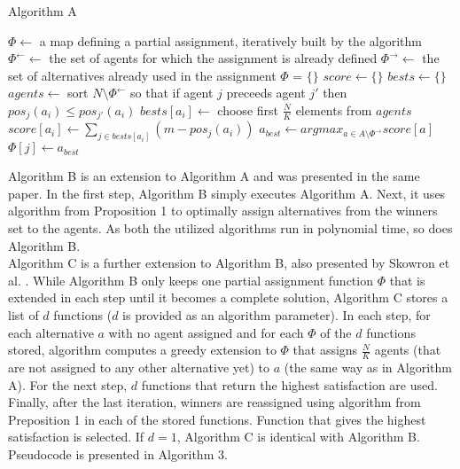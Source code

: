\begin{algorithm}
\caption{Algorithm A}\label{euclid}
\begin{algorithmic}[1]
		\State $\Phi \gets$ a map defining a partial assignment, iteratively built by the algorithm
		\State $\Phi^{\leftarrow} \gets$ the set of agents for which the assignment is already defined
		\State $\Phi^{\rightarrow} \gets$ the set of alternatives already used in the assignment%
		\State $\Phi$ = $\{\}$
			\State $score \gets \{\}$
			\State $bests \gets \{\}$
				\State $agents \gets$ sort $N \setminus \Phi^{\leftarrow}$ so that if agent $j$ preceeds agent $j'$ then $pos_{j}(a_{i}) \leq pos_{j'}(a_{i})$
				\State $bests[a_{i}] \gets$ choose first $\frac{N}{K}$ elements from $agents$
				\State $score[a_{i}] \gets \sum_{j \in bests[a_{i}]}(m - pos_{j}(a_{i}))$
			\EndFor
			\State $a_{best} \gets argmax_{a \in A \setminus \Phi^{\rightarrow}} score[a]$
				\State $\Phi[j] \gets a_{best}$
			\EndFor
		\EndFor
	\EndProcedure
\end{algorithmic}
\end{algorithm}

Algorithm B is an extension to Algorithm A and was presented in the same paper. \cite{1} In the first step, Algorithm B simply executes Algorithm A. Next, it uses algorithm from Proposition 1 to optimally assign alternatives from the winners set to the agents. As both the utilized algorithms run in polynomial time, so does Algorithm B.
\\

Algorithm C is a further extension to Algorithm B, also presented by Skowron et al. \cite{1}. While Algorithm B only keeps one partial assignment function $\Phi$ that is extended in each step until it becomes a complete solution, Algorithm C stores a list of $d$ functions ($d$ is provided as an algorithm parameter). In each step, for each alternative $a$ with no agent assigned and for each $\Phi$ of the $d$ functions stored, algorithm computes a greedy extension to $\Phi$ that assigns $\frac{N}{K}$ agents (that are not assigned to any other alternative yet) to $a$ (the same way as in Algorithm A). For the next step, $d$ functions that return the highest satisfaction are used. Finally, after the last iteration, winners are reassigned using algorithm from Preposition 1 in each of the stored functions. Function that gives the highest satisfaction is selected. If $d = 1$, Algorithm C is identical with Algorithm B. Pseudocode is presented in Algorithm 3.
\\

